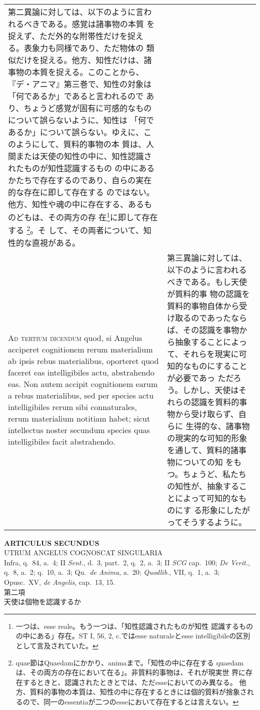 \documentclass[10pt]{jsarticle} %
\begin{document}
\begin{longtable}{p{21em}p{21em}}
第二異論に対しては、以下のように言われるべきである。感覚は諸事物の本質
を捉えず、ただ外的な附帯性だけを捉える。表象力も同様であり、ただ物体の
類似だけを捉える。他方、知性だけは、諸事物の本質を捉える。このことから、
『デ・アニマ』第三巻で、知性の対象は「何であるか」であると言われるので
あり、ちょうど感覚が固有に可感的なものについて誤らないように、知性は
「何であるか」について誤らない。ゆえに、このようにして、質料的事物の本
質は、人間または天使の知性の中に、知性認識されたものが知性認識するもの
の中にあるかたちで存在するのであり、自らの実在的な存在に即して存在する
のではない。他方、知性や魂の中に存在する、あるものどもは、その両方の存
在\footnote{一つは、esse reale。もう一つは、「知性認識されたものが知性
認識するものの中にある」存在。ST I, 56, 2, c.ではesse naturaleとesse
intelligibileの区別として言及されていた。}に即して存在する
\footnote{quae節はQuaedamにかかり、animaまで。「知性の中に存在する
quaedamは、その両方の存在において在る」。非質料的事物は、それが現実世
界に存在するときと、認識されたときとでは、ただesseにおいてのみ異なる。
他方、質料的事物の本質は、知性の中に存在するときには個的質料が捨象され
るので、同一のessentiaが二つのesseにおいて存在するとは言えない。}。そ
して、その両者について、知性的な直視がある。


\\


{\scshape Ad tertium dicendum} quod, si Angelus acciperet cognitionem
rerum materialium ab ipsis rebus materialibus, oporteret quod faceret
eas intelligibiles actu, abstrahendo eas. Non autem accipit
cognitionem earum a rebus materialibus, sed per species actu
intelligibiles rerum sibi connaturales, rerum materialium notitiam
habet; sicut intellectus noster secundum species quas intelligibiles
facit abstrahendo.


&

第三異論に対しては、以下のように言われるべきである。もし天使が質料的事
物の認識を質料的事物自体から受け取るのであったならば、その認識を事物か
ら抽象することによって、それらを現実に可知的なものにすることが必要であっ
ただろう。しかし、天使はそれらの認識を質料的事物から受け取らず、自らに
生得的な、諸事物の現実的な可知的形象を通して、質料的諸事物についての知
をもつ。ちょうど、私たちの知性が、抽象することによって可知的なものにす
る形象にしたがってそうするように。




\end{longtable}
\newpage





\begin{center}
{\Large {\bf ARTICULUS SECUNDUS}}\\ {\large UTRUM ANGELUS COGNOSCAT
SINGULARIA}\\ {\footnotesize Infra, q.~84, a.~4; II {\itshape Sent.},
d.~3, part.~2, q.~2, a.~3; II {\itshape SCG} cap.~100; {\itshape De
Verit.}, q.~8, a.~2; q.~10, a.~3; Qu.~{\itshape de Anima}, a.~20;
{\itshape Quodlib.}, VII, q.~1, a.~3; Opusc.~XV, {\itshape de
Angelis}, cap.~13, 15.}\\ {\Large 第二項\\天使は個物を認識するか}
\end{center}
\end{document}
